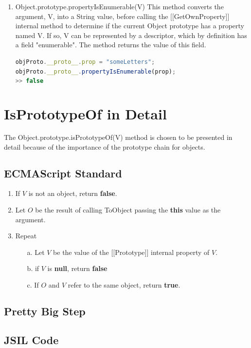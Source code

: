\documentclass[a4paper,11pt,twoside]{report}
\newif\ifComments
\newcommand{\az}[1]{%
\ifComments
\begin{center}
\fbox{%
\begin{minipage}{3in} \color{red}
{\bf AZ:} {\rm #1}
\end{minipage}
}
\end{center}
\fi
}
\def\jsinline{\lstinline[language=JavaScript, basicstyle=\small]}
\begin{document}
\begin{enumerate}
\item Object.prototype.propertyIsEnumerable(V) \newline
This method converts the argument, V, into a String value, before calling the [[GetOwnProperty]] internal method to determine if the current Object prototype has a property named V. If so, V can be represented by a descriptor, which by definition has a field "enumerable". The method returns the value of this field.

\jsinline|objProto.__proto__.prop = "someLetters";| \\
\jsinline|objProto.__proto__.propertyIsEnumerable(prop);| \\
\jsinline|>> false|

\end{enumerate}

\section{IsPrototypeOf in Detail}
The Object.prototype.isPrototypeOf(V) method is chosen to be presented in detail because of the importance of the prototype chain for objects. 

\subsection{ECMAScript Standard}
\begin{enumerate}
\item If $V$ is not an object, return \textbf{false}.
\item Let $O$ be the result of calling ToObject passing the \textbf{this} value as the argument.
\item Repeat
\begin{enumerate}
\item[a.] Let $V$ be the value of the [[Prototype]] internal property of $V$.
\item[b.] if $V$ is \textbf{null}, return \textbf{false}
\item[c.] If $O$ and $V$ refer to the same object, return \textbf{true}.
\end{enumerate}
\end{enumerate}

\subsection{Pretty Big Step}
\az{TODO}

\subsection{JSIL Code}
\end{document}

